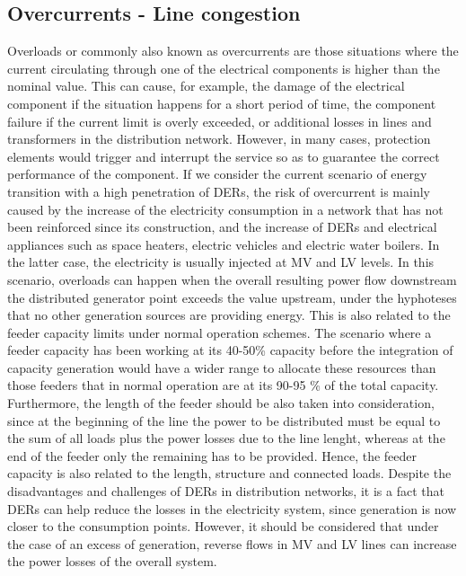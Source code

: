 \subsection{Overcurrents - Line congestion}
Overloads or commonly also known as overcurrents are those situations where the current circulating through one of the electrical components is higher than the nominal value. This can cause, for example, the damage of the electrical component if the situation happens for a short period of time, the component failure if the current limit is overly exceeded, or additional losses in lines and transformers in the distribution network. However, in many cases, protection elements would trigger and interrupt the service so as to guarantee the correct performance of the component. 
If we consider the current scenario of energy transition with a high penetration of DERs, the risk of overcurrent is mainly caused by the increase of the electricity consumption in a network that has not been reinforced since its construction, and the increase of DERs and electrical appliances such as space heaters, electric vehicles and electric water boilers. In the latter case, the electricity is usually injected at MV and LV levels. In this scenario, overloads can happen when the overall resulting power flow downstream the distributed generator point exceeds the value upstream, under the hyphoteses that no other generation sources are providing energy. This is also related to the feeder capacity limits under normal operation schemes. The scenario where a feeder capacity has been working at its 40-50\% capacity before the integration of capacity generation would have a wider range to allocate these resources than those feeders that in normal operation are at its 90-95 \% of the total capacity. Furthermore, the length of the feeder should be also taken into consideration, since at the beginning of the line the power to be distributed must be equal to the sum of all loads plus the power losses due to the line lenght, whereas at the end of the feeder only the remaining has to be provided. Hence, the feeder capacity is also related to the length, structure and connected loads. 
Despite the disadvantages and challenges of DERs in distribution networks, it is a fact that DERs can help reduce the losses in the electricity system, since generation is now closer to the consumption points. However, it should be considered that under the case of an excess of generation, reverse flows in MV and LV lines can increase the power losses of the overall system. 


